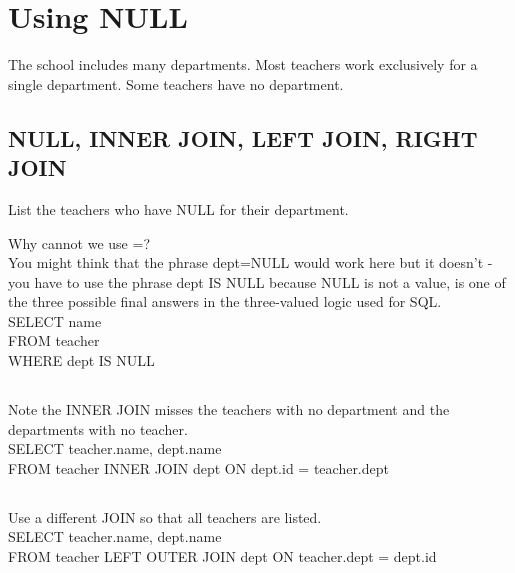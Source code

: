 \documentclass[10pt, oneside]{article}
\begin{document}
\section{Using NULL}

The school includes many departments. Most teachers work exclusively for a single department. Some teachers have no department.

\subsection{NULL, INNER JOIN, LEFT JOIN, RIGHT JOIN}

List the teachers who have NULL for their department.

Why cannot we use =?\\
You might think that the phrase dept=NULL would work here but it doesn't - you have to use the phrase dept IS NULL because NULL is not a value, is one of the three possible final answers in the three-valued logic used for SQL.\\

SELECT name\\
FROM teacher\\
WHERE dept IS NULL\\

\subsection{}

Note the INNER JOIN misses the teachers with no department and the departments with no teacher.\\

SELECT teacher.name, dept.name \\
FROM teacher INNER JOIN dept ON dept.id = teacher.dept \\

\subsection{}

Use a different JOIN so that all teachers are listed.\\

SELECT teacher.name, dept.name\\
FROM teacher LEFT OUTER JOIN dept ON teacher.dept = dept.id\\

\subsection{}
\end{document}
